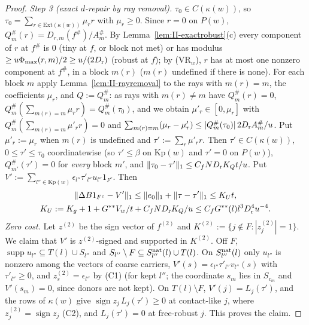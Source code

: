 \documentclass[10pt]{amsart}
\theoremstyle{definition}
\theoremstyle{remark}
\newcommand{\supp}{\operatorname{supp}}
\newcommand{\sgn}{\operatorname{sign}}
\begin{document}
\begin{proof}
\emph{Step 3 (exact $d$-repair by ray removal).}  $\tau_0\in C(\kappa(w))$, so
$\tau_0=\sum_{r\in\mathrm{Ext}(\kappa(w))}\mu_rr$ with $\mu_r\ge0$.  Since
$r=0$ on $P(w)$, $Q^\#_m(r)=D_{r,m}(f^\#)/A^\#_m$.  By
Lemma~\ref{lem:II-exactrobust}(c) every component of $r$ at $f^\#$ is $0$
(tiny at $f$, or block not met) or has modulus $\ge u\Phi_{\max}(r,m)/2\ge
u/(2D_{\rm r})$ (robust at $f$); by (VR$_w$), $r$ has at most one nonzero
component at $f^\#$, in a block $m(r)$ ($m(r)$ undefined if there is none).
For each block $m$ apply Lemma~\ref{lem:II-rayremoval} to the rays with
$m(r)=m$, the coefficients $\mu_r$, and $Q:=Q^\#_m$: as rays with
$m(r)\ne m$ have $Q^\#_m(r)=0$, $Q^\#_m(\sum_{m(r)=m}\mu_rr)=Q^\#_m(\tau_0)$,
and we obtain $\mu'_r\in[0,\mu_r]$ with $Q^\#_m(\sum_{m(r)=m}\mu'_rr)=0$ and
$\sum_{m(r)=m}(\mu_r-\mu'_r)\le|Q^\#_m(\tau_0)|\,2D_{\rm r}A^\#_m/u$.  Put
$\mu'_r:=\mu_r$ when $m(r)$ is undefined and $\tau':=\sum_r\mu'_rr$.  Then
$\tau'\in C(\kappa(w))$, $0\le\tau'\le\tau_0$ coordinatewise (so
$\tau'\le\beta$ on $\mathrm{Kp}(w)$ and $\tau'=0$ on $P(w)$),
$Q^\#_{m'}(\tau')=0$ for \emph{every} block $m'$, and $\|\tau_0-\tau'\|_1\le
C_fND_{\rm r}K_Qt/u$.  Put $V':=\sum_{l''\in\mathrm{Kp}(w)}\epsilon_{l''}
\tau'_{l''}u_{l''}1_{F^c}$.  Then
\begin{gather*}
 \|\Delta B1_{F^c}-V'\|_1\le\|e_0\|_1+\|\tau-\tau'\|_1\le K_Ut,\\
 K_U:=K_g+1+G^{**}V_w/t+C_fND_{\rm r}K_Q/u\le C_fG^{**}(l)l^3D_{\rm r}^4u^{-4}.
\end{gather*}
\emph{Zero cost.}  Let $z^{(2)}$ be the sign vector of $f^{(2)}$ and
$K^{(2)}:=\{j\notin F:|z^{(2)}_j|=1\}$.  We claim that $V'$ is
$z^{(2)}$-signed and supported in $K^{(2)}$.  Off $F$, $\supp u_{l''}
\subseteq T(l)\cup S_{l''}$ and $S_{l''}\setminus F\subseteq S^{\rm nat}_{l''}(l)
\cup T(l)$.  On $S^{\rm nat}_{l''}(l)$ only $u_{l''}$ is nonzero among the
vectors of coarse carriers, $V'(s)=\epsilon_{l''}\tau'_{l''}v_{l''}(s)$ with
$\tau'_{l''}\ge0$, and $z^{(2)}_s=\epsilon_{l''}$ by (C1) (for kept $l''$;
the coordinate $s_m$ lies in $S_{c_m}$ and $V'(s_m)=0$, since donors are not
kept).  On $T(l)\setminus F$, $V'(j)=L_j(\tau')$, and the rows of
$\kappa(w)$ give $\sgn z_j\,L_j(\tau')\ge0$ at contact-like $j$, where
$z^{(2)}_j=\sgn z_j$ (C2), and $L_j(\tau')=0$ at free-robust $j$.  This
proves the claim.


\end{proof}
\end{document}
